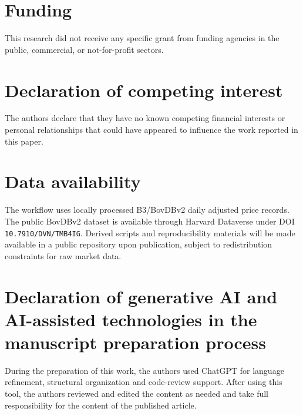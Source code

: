 \section*{Funding}
This research did not receive any specific grant from funding agencies in the public, commercial, or not-for-profit sectors.

\section*{Declaration of competing interest}
The authors declare that they have no known competing financial interests or personal relationships that could have appeared to influence the work reported in this paper.

\section*{Data availability}
The workflow uses locally processed B3/BovDBv2 daily adjusted price records. The public BovDBv2 dataset is available through Harvard Dataverse under DOI \texttt{10.7910/DVN/TMB4IG}. Derived scripts and reproducibility materials will be made available in a public repository upon publication, subject to redistribution constraints for raw market data.

\section*{Declaration of generative AI and AI-assisted technologies in the manuscript preparation process}
During the preparation of this work, the authors used ChatGPT for language refinement, structural organization and code-review support. After using this tool, the authors reviewed and edited the content as needed and take full responsibility for the content of the published article.

